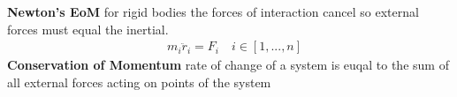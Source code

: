 \documentclass[conference]{IEEEtran}
\begin{document}
\textbf{Newton's EoM} for rigid bodies the forces of interaction cancel so external forces must equal the inertial.
\begin{align*}
    & m_i \ddot{r}_i = F_i \quad i \in [1, ..., n]
\end{align*}
\textbf{Conservation of Momentum} rate of change of a system is euqal to the sum of all external forces acting on points of the system
\end{document}
